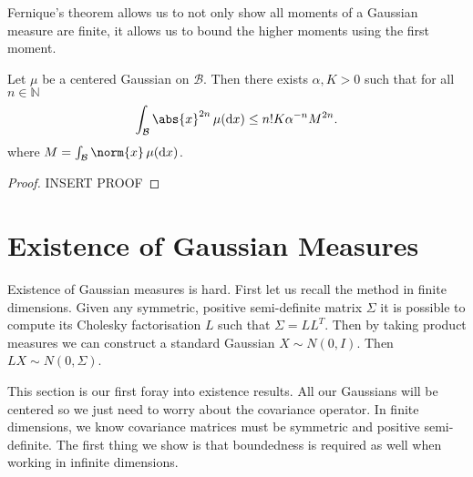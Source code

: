 \documentclass[fontsize=12pt, DIV=12]{scrreprt}
\newcommand{\N}{\mathbb N}
\newcommand{\calB}{\mathcal B}
\newcommand{\dif}[1]{\text{d} #1}
\begin{document}
Fernique's theorem allows us to not only show all moments of a Gaussian measure are finite, it allows us to bound the higher moments using the first moment.

\begin{prop}
	\label{prop:bounded-moments}
	Let $\mu$ be a centered Gaussian on $\calB$. Then there exists $\alpha, K > 0$ such that for all $n \in \N$
	\begin{equation}
		\int_{\calB} \abs{x}^{2n} \, \mu(\dif x) \leq n! K \alpha^{-n} M^{2n}.
	\end{equation}
	where $M = \int_{\calB} \norm{x} \, \mu(\dif x)$.
\end{prop}
\begin{proof}
	INSERT PROOF
\end{proof}

\section{Existence of Gaussian Measures}

Existence of Gaussian measures is hard. First let us recall the method in finite dimensions. Given any symmetric, positive semi-definite matrix $\Sigma$ it is possible to compute its Cholesky factorisation $L$ such that $\Sigma = LL^T$. Then by taking product measures we can construct a standard Gaussian $X \sim N(0, I)$. Then $LX \sim N(0, \Sigma)$.

This section is our first foray into existence results. All our Gaussians will be centered so we just need to worry about the covariance operator. In finite dimensions, we know covariance matrices must be symmetric and positive semi-definite. The first thing we show is that boundedness is required as well when working in infinite dimensions.
\end{document}
